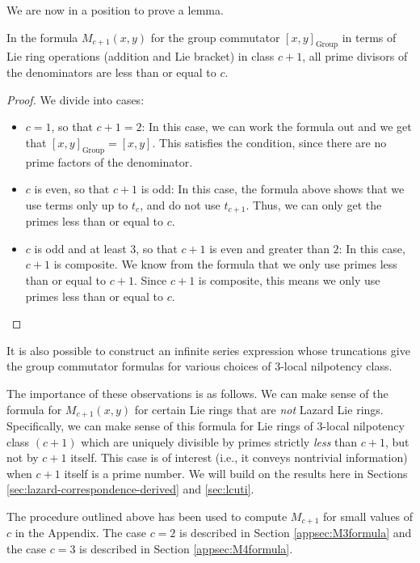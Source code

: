 We are now in a position to prove a lemma.

\begin{lemma}\label{lemma:commutator-denominators}
  In the formula $M_{c+1}(x,y)$ for the group commutator
  $[x,y]_{\text{Group}}$ in terms of Lie ring operations (addition and
  Lie bracket) in class $c + 1$, all prime divisors of the
  denominators are less than or equal to $c$.
\end{lemma}

\begin{proof}
  We divide into cases:

  \begin{itemize}
  \item $c = 1$, so that $c + 1 = 2$: In this case, we can work the
    formula out and we get that $[x,y]_{\text{Group}} = [x,y]$. This
    satisfies the condition, since there are no prime factors of the
    denominator.
  \item $c$ is even, so that $c + 1$ is odd: In this case, the
    formula above shows that we use terms only up to $t_c$, and do not
    use $t_{c+1}$. Thus, we can only get the primes less than or equal
    to $c$.
  \item $c$ is odd and at least $3$, so that $c + 1$ is even and
    greater than $2$: In this case, $c + 1$ is composite. We know from the
    formula that we only use primes less than or equal to $c + 1$. Since
    $c + 1$ is composite, this means we only use primes less than or equal
    to $c$.
  \end{itemize}
\end{proof}

It is also possible to construct an infinite series expression whose
truncations give the group commutator formulas for various choices of
$3$-local nilpotency class.

The importance of these observations is as follows. We can make sense
of the formula for $M_{c+1}(x,y)$ for certain Lie rings that are {\em
  not} Lazard Lie rings. Specifically, we can make sense of this
formula for Lie rings of $3$-local nilpotency class $(c + 1)$ which
are uniquely divisible by primes strictly {\em less} than $c + 1$, but
not by $c + 1$ itself. This case is of interest (i.e., it conveys
nontrivial information) when $c + 1$ itself is a prime number. We will
build on the results here in Sections
\ref{sec:lazard-correspondence-derived} and \ref{sec:lcuti}.

The procedure outlined above has been used to compute $M_{c+1}$ for
small values of $c$ in the Appendix. The case $c = 2$ is described in
Section \ref{appsec:M3formula} and the case $c = 3$ is described in
Section \ref{appsec:M4formula}.

